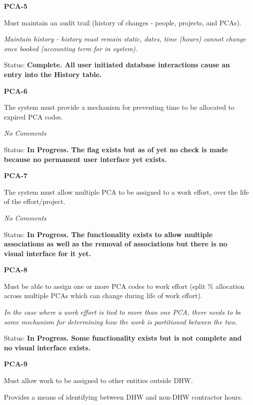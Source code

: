 \documentclass{article}
\begin{document}
\noindent \textbf{PCA-5}

\noindent Must maintain an audit trail (history of changes - people, projects, and PCAs).

\noindent \textit{Maintain history - history must remain static, dates, time (hours) cannot change once booked (accounting term for in system).}

\noindent Status: \textbf{Complete.  All user initiated database interactions cause an entry into the History table.}

\noindent \textit{}


\noindent \textbf{PCA-6}

\noindent The system must provide a mechanism for preventing time to be allocated to expired PCA codes.

\textit{No Comments}

\noindent Status: \textbf{In Progress.  The flag exists but as of yet no check is made because no permanent user interface yet exists.}

\noindent \textit{}


\noindent \textbf{PCA-7}

\noindent The system must allow multiple PCA to be assigned to a work effort, over the life of the effort/project.

\textit{No Comments}

\noindent Status: \textbf{In Progress.  The functionality exists to allow multiple associations as well as the removal of associations but there is no visual interface for it yet.}

\noindent \textit{}


\noindent \textbf{PCA-8}

\noindent Must be able to assign one or more PCA codes to work effort (split \% allocation across multiple PCAs which can change during life of work effort).

\noindent \textit{In the case where a work effort is tied to more than one PCA, there needs to be some mechanism for determining how the work is partitioned between the two.}

\noindent Status: \textbf{In Progress.  Some functionality exists but is not complete and no visual interface exists.}

\noindent \textit{}


\noindent \textbf{PCA-9}

\noindent Must allow work to be assigned to other entities outside DHW.

Provides a means of identifying between DHW and non-DHW contractor hours.
\end{document}
